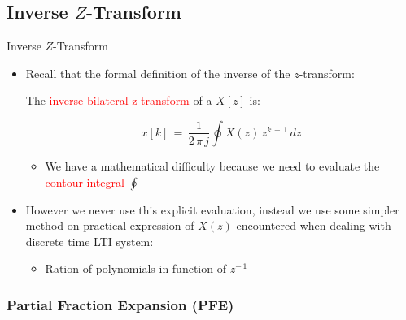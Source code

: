 \subsection{Inverse $Z$-Transform}

\begin{frame}[t]{Inverse $Z$-Transform}

\begin{itemize}

\item Recall that the formal definition of the inverse of the $z$-transform:

\begin{definition}

The \textcolor{red}{inverse bilateral z-transform} of a $X[z]$ is:

\begin{equation}
x[k] \, = \, \displaystyle\frac{1}{2 \, \pi \, j} \displaystyle\oint X(z) \, z^{k \, - \, 1} \, dz
\end{equation}

\end{definition}


	\begin{itemize}
	\item We have a mathematical difficulty because we need to evaluate the \textcolor{red}{contour integral} $\displaystyle\oint$
	\end{itemize}


\item However we never use this explicit evaluation, instead we use some simpler method on practical expression of $X(z)$ encountered when dealing with discrete time LTI system:

	\begin{itemize}
	\item Ration of polynomials in function of $z^{- \, 1}$
	\end{itemize}

\end{itemize}

\end{frame}


\subsubsection{Partial Fraction Expansion (PFE)}

